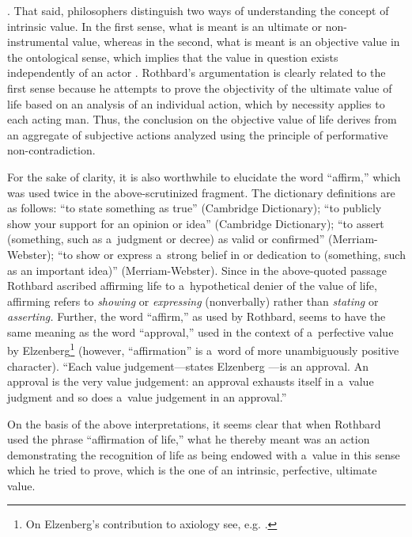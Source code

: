 \parencites[see][p.21ff]{}[][p.77]{}[][]{}[][]{}. %
 That said, philosophers distinguish two ways of understanding the concept of intrinsic value. In the first sense, what is meant is an ultimate or non-instrumental value, whereas in the second, what is meant is an objective value in the ontological sense, which implies that the value in question exists independently of an actor 
\parencite[see][p.8]{}. %
 Rothbard's argumentation is clearly related to the first sense because he attempts to prove the objectivity of the ultimate value of life based on an analysis of an individual action, which by necessity applies to each acting man. Thus, the conclusion on the objective value of life derives from an aggregate of subjective actions analyzed using the principle of performative non-contradiction.



For the sake of clarity, it is also worthwhile to elucidate the word ``affirm,'' which was used twice in the above-scrutinized fragment. The dictionary definitions are as follows: ``to state something as true'' (Cambridge Dictionary); ``to publicly show your support for an opinion or idea'' (Cambridge Dictionary); ``to assert (something, such as a~judgment or decree) as valid or confirmed'' (Merriam-Webster); ``to show or express a~strong belief in or dedication to (something, such as an important idea)'' (Merriam-Webster). Since in the above-quoted passage Rothbard ascribed affirming life to a~hypothetical denier of the value of life, affirming refers to \textit{showing} or \textit{expressing} (nonverbally) rather than \textit{stating} or \textit{asserting.} Further, the word ``affirm,'' as used by Rothbard, seems to have the same meaning as the word ``approval,'' used in the context of a~perfective value by Elzenberg\footnote{On Elzenberg's contribution to axiology see, e.g. 
\parencite[][pp.73–86]{}.%
} (however, ``affirmation'' is a~word of more unambiguously positive character). ``Each value judgement---states Elzenberg 
\parencite*[][p.25]{}%
---is an approval. An approval is the very value judgement: an approval exhausts itself in a~value judgment and so does a~value judgement in an approval.''



On the basis of the above interpretations, it seems clear that when Rothbard used the phrase ``affirmation of life,'' what he thereby meant was an action demonstrating the recognition of life as being endowed with a~value in this sense which he tried to prove, which is the one of an intrinsic, perfective, ultimate value.



